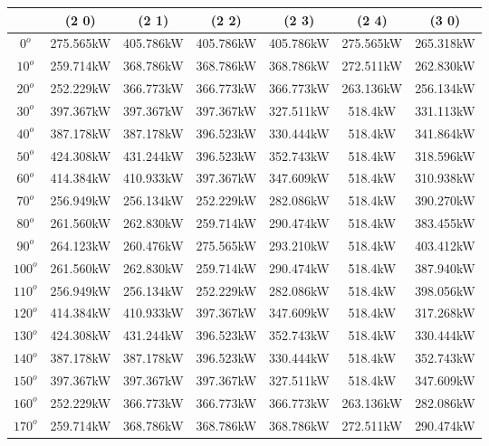        \begin{table}[H]
        	\centering
        	\begin{tabular}{|c|c|c|c|c|c|c|} \hline
        			& (2 0)		& (2 1)		& (2 2)		& (2 3)		& (2 4)		& (3 0)		\\ \hline
		$0^o$	& 275.565kW	& 405.786kW	& 405.786kW	& 405.786kW	& 275.565kW	& 265.318kW	\\ \hline
		$10^o$	& 259.714kW	& 368.786kW	& 368.786kW	& 368.786kW	& 272.511kW	& 262.830kW	\\ \hline
		$20^o$	& 252.229kW	& 366.773kW	& 366.773kW	& 366.773kW	& 263.136kW	& 256.134kW	\\ \hline
		$30^o$	& 397.367kW	& 397.367kW	& 397.367kW	& 327.511kW	& 518.4kW	& 331.113kW	\\ \hline
		$40^o$	& 387.178kW	& 387.178kW	& 396.523kW	& 330.444kW	& 518.4kW	& 341.864kW	\\ \hline
		$50^o$	& 424.308kW	& 431.244kW	& 396.523kW	& 352.743kW	& 518.4kW	& 318.596kW	\\ \hline
		$60^o$	& 414.384kW	& 410.933kW	& 397.367kW	& 347.609kW	& 518.4kW	& 310.938kW	\\ \hline
		$70^o$	& 256.949kW	& 256.134kW	& 252.229kW	& 282.086kW	& 518.4kW	& 390.270kW	\\ \hline
		$80^o$	& 261.560kW	& 262.830kW	& 259.714kW	& 290.474kW	& 518.4kW	& 383.455kW	\\ \hline
		$90^o$	& 264.123kW	& 260.476kW	& 275.565kW	& 293.210kW	& 518.4kW	& 403.412kW	\\ \hline
		$100^o$	& 261.560kW	& 262.830kW	& 259.714kW	& 290.474kW	& 518.4kW	& 387.940kW	\\ \hline
		$110^o$	& 256.949kW	& 256.134kW	& 252.229kW	& 282.086kW	& 518.4kW	& 398.056kW	\\ \hline
		$120^o$	& 414.384kW	& 410.933kW	& 397.367kW	& 347.609kW	& 518.4kW	& 317.268kW	\\ \hline
		$130^o$	& 424.308kW	& 431.244kW	& 396.523kW	& 352.743kW	& 518.4kW	& 330.444kW	\\ \hline
		$140^o$	& 387.178kW	& 387.178kW	& 396.523kW	& 330.444kW	& 518.4kW	& 352.743kW	\\ \hline
		$150^o$	& 397.367kW	& 397.367kW	& 397.367kW	& 327.511kW	& 518.4kW	& 347.609kW	\\ \hline
		$160^o$	& 252.229kW	& 366.773kW	& 366.773kW	& 366.773kW	& 263.136kW	& 282.086kW	\\ \hline
		$170^o$	& 259.714kW	& 368.786kW	& 368.786kW	& 368.786kW	& 272.511kW	& 290.474kW	\\ \hline

\end{tabular}
\end{table}
